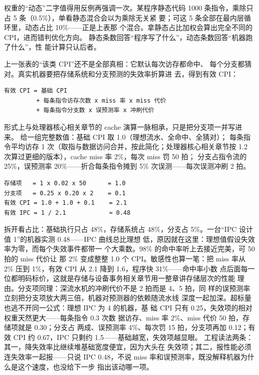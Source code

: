 权重的“动态”二字值得用反例再强调一次。某程序静态代码 1000
条指令，乘除只占 5 条（0.5\%），单看静态混合会以为乘除无关紧
要；可这 5 条全部在最内层循环里，动态占比 10\%——正是上表那
个混合。拿静态占比加权会算出完全不同的 CPI，进而错判优化方向。
静态条数回答“程序写了什么”，动态条数回答“机器跑了什么”，性
能计算只认后者。

上一张表的“该类 CPI”还不是全部真相：它默认每次访存都命中、
每个分支都猜对。真实机器要把存储系统和分支预测的失效率折算进
去，得到有效 CPI：

\begin{lstlisting}
有效 CPI = 基础 CPI
         + 每条指令访存次数 x miss 率 x miss 代价
         + 每条指令分支数 x 误预测率 x 冲刷代价
\end{lstlisting}

形式上与处理器核心相关章节的 cache 演算一脉相承，只是把分支项一并写进来。
给一组完整数值：基础 CPI 取 1.0（理想流水、全命中、全猜对）；
每条指令平均访存 1 次（取指与数据访问合并，按此简化；处理器核心相关章节按
1.2 次算过更细的版本），cache miss 率 2\%，每次 miss 罚 50 拍；
分支占指令流的 25\%，误预测率 20\%——折合每条指令摊到 5\%
次误测——每次误测冲刷 2 拍。

\begin{lstlisting}
存储项   = 1 x 0.02 x 50      = 1.0
分支项   = 0.25 x 0.20 x 2    = 0.1
有效 CPI = 1.0 + 1.0 + 0.1    = 2.1
有效 IPC = 1 / 2.1            ≈ 0.48
\end{lstlisting}

拆开看占比：基础执行只占 48\%，存储系统占 48\%，分支占
5\%。一台“IPC 设计值 1”的机器实测 0.48——IPC 曲线总比理想
低，原因就在这里：理想值假设失效率为零，而每个失效事件都带一
个大乘数。98\% 的命中率听上去接近完美，可 50 拍的 miss 代价让
那 2\% 变成整整 1.0 个 CPI。敏感性也算一笔：把 miss 率从 2\%
压到 1\%，有效 CPI 从 2.1 降到 1.6，程序快 31\%——命中率小数
点后面每一位都明码标价，这就是存储与设备事务相关章节用一整章讲存储层次的性能
理由。分支项同理：深流水机的冲刷代价不是 2 拍而是 4、5 拍，同
样的误预测率立刻把分支项放大两三倍，机器对预测器的依赖随流水线
深度一起加深。超标量也逃不开同一公式：理想 IPC 为 4 的机器，基
础 CPI 只有 0.25，失效项的相对权重天然更大——每条指令 0.3 次数
据访存、miss 率 2\%、miss 代价 50 拍，存储项就是 0.30；分支占
两成、误预测率 4\%、每次罚 15 拍，分支项再加 0.12；有效 CPI 约
0.67，IPC 只剩约 1.5——基础越宽，失效项越显眼。
工程读法两条：其一，降失效率比继续堆基础宽度便宜，因为大头在
失效项；其二，报性能必须连失效率一起报——只说 IPC 0.48，不说
miss 率和误预测率，既没解释机器为什么是这个速度，也没给下一步
指出该动哪一项。

